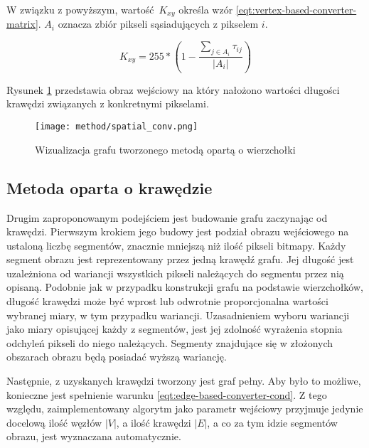 {{{            W związku z powyższym, wartość $K_{xy}$ określa wzór \ref{eqt:vertex-based-converter-matrix}. $A_i$ oznacza
            zbiór pikseli sąsiadujących z pikselem $i$.

            \begin{equation}\label{eqt:vertex-based-converter-matrix}
                K_{xy} = 255 * (1 - \frac{\sum_{j \in A_i} \tau_{ij}}{|A_i|})
            \end{equation}

            Rysunek \ref{fig:method-vis-vertex} przedstawia obraz wejściowy na który nałożono wartości długości krawędzi
            związanych z konkretnymi pikselami.

            \begin{figure}
                \centering
                \texttt{[image: method/spatial\_conv.png]}
                \caption{Wizualizacja grafu tworzonego metodą opartą o wierzchołki}
                \label{fig:method-vis-vertex}
            \end{figure}
        }

        \subsection{Metoda oparta o krawędzie}
        {
            Drugim zaproponowanym podejściem jest budowanie grafu zaczynając od krawędzi. Pierwszym krokiem jego budowy
            jest podział obrazu wejściowego na ustaloną liczbę segmentów, znacznie mniejszą niż ilość pikseli
            bitmapy. Każdy segment obrazu jest reprezentowany przez jedną krawędź grafu. Jej długość jest uzależniona od
            wariancji wszystkich pikseli należących do segmentu przez nią opisaną. Podobnie jak w przypadku konstrukcji
            grafu na podstawie wierzchołków, długość krawędzi może być wprost lub odwrotnie proporcjonalna wartości
            wybranej miary, w tym przypadku wariancji. Uzasadnieniem wyboru wariancji jako miary opisującej każdy z
            segmentów, jest jej zdolność wyrażenia stopnia odchyleń pikseli do niego należących. Segmenty znajdujące się
            w złożonych obszarach obrazu będą posiadać wyższą wariancję.

            Następnie, z uzyskanych krawędzi tworzony jest graf pełny. Aby było to możliwe, konieczne jest spełnienie
            warunku \ref{eqt:edge-based-converter-cond}. Z tego względu, zaimplementowany algorytm jako parametr
            wejściowy przyjmuje jedynie docelową ilość węzłów $|V|$, a ilość krawędzi $|E|$, a co za tym idzie segmentów
            obrazu, jest wyznaczana automatycznie.

}}}
